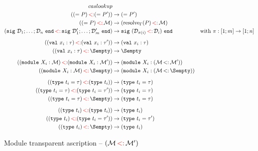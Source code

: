 \begin{align*}
  cas lookup\\
  \Otransp{\Salias{\ip}}{\Salias{\ip'}}
  &\to \Salias{\ip'}
  \\
  \Otransp{\Salias{\ip}}{\iM}
  &\to \Otransp{\resolve{\E}{\ip}}{\iM}\\
  \Otransp{\Ssig{\iD_1;\dots;\iD_n}}{\Ssig{\iD'_1;\dots;\iD'_m}}
  &\to \Ssig{\Otransp{\iD_{\pi(i)}}{\iD_i}}
  & \text{with } \pi:\rg{1}{m} \to \rg{1}{n}
  \\[2mm]
  \Otransp{(\Sval{x_i}{\tau})}{(\Sval{x_i}{\tau'})}
  &\to (\Sval{x_i}{\tau})
  \\
  \Otransp{(\Sval{x_i}{\tau})}{\Sempty}
  &\to \Sempty
  \\[2mm]
  \Otransp{(\Smodulety{X_i}{\iM})}{(\Smodulety{X_i}{\iM'})}
  &\to (\Smodulety{X_i}{\Stransp{\iM}{\iM'}})
  \\
  \Otransp{(\Smodulety{X_i}{\iM})}{\Sempty}
  &\to (\Smodulety{X_i}{\Stransp{\iM}{\Sempty}})
  \\[2mm]
  \Otransp{(\Stype{t_i}{\tau})}{(\Stypeabs{t_i})}
  &\to (\Stype{t_i}{\tau})
  \\
  \Otransp{(\Stype{t_i}{\tau})}{(\Stype{t_i}{\tau'})}
  &\to (\Stype{t_i}{\tau})
  \\
  \Otransp{(\Stype{t_i}{\tau})}{\Sempty}
  &\to (\Stype{t_i}{\tau})
  \\[2mm]
  \Otransp{(\Stypeabs{t_i})}{(\Stypeabs{t_i})}
  &\to (\Stypeabs{t_i})
  \\
  \Otransp{(\Stypeabs{t_i})}{(\Stype{t_i}{\tau'})}
  &\to (\Stype{t_i}{\tau'})
  \\
  \Otransp{(\Stypeabs{t_i})}{\Sempty}
  &\to (\Stypeabs{t_i})\\
\end{align*}\vspace{-3mm}
\caption{Module transparent ascription -- $(\mathcal M \operatorname{{\color{red}<:}} \mathcal M')$}
\label{module:transp}

